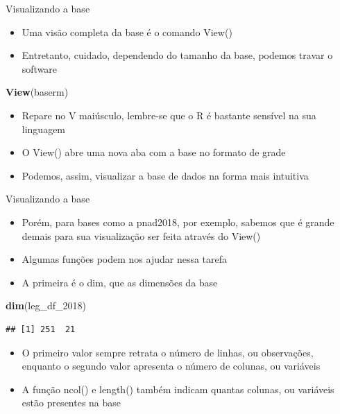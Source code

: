 \documentclass[
  10pt,
  ignorenonframetext,
]{beamer}
\newenvironment{Shaded}{\begin{snugshade}}{\end{snugshade}}
\newcommand{\DecValTok}[1]{\textcolor[rgb]{0.00,0.00,0.81}{#1}}
\newcommand{\KeywordTok}[1]{\textcolor[rgb]{0.13,0.29,0.53}{\textbf{#1}}}
\newcommand{\NormalTok}[1]{#1}
\providecommand{\tightlist}{%
  \setlength{\itemsep}{0pt}\setlength{\parskip}{0pt}}
\begin{document}
\begin{frame}[fragile]{Visualizando a base}
\protect\hypertarget{visualizando-a-base-1}{}
\begin{itemize}
\tightlist
\item
  Uma visão completa da base é o comando View()
\item
  Entretanto, cuidado, dependendo do tamanho da base, podemos travar o
  software
\end{itemize}

\begin{Shaded}
\begin{Highlighting}[]
\KeywordTok{View}\NormalTok{(baserm)}
\end{Highlighting}
\end{Shaded}

\begin{itemize}
\tightlist
\item
  Repare no V maiúsculo, lembre-se que o R é bastante sensível na sua
  linguagem
\item
  O View() abre uma nova aba com a base no formato de grade
\item
  Podemos, assim, visualizar a base de dados na forma mais intuitiva
\end{itemize}
\end{frame}

\begin{frame}[fragile]{Visualizando a base}
\protect\hypertarget{visualizando-a-base-2}{}
\begin{itemize}
\tightlist
\item
  Porém, para bases como a pnad2018, por exemplo, sabemos que é grande
  demais para sua visualização ser feita através do View()
\item
  Algumas funções podem nos ajudar nessa tarefa
\item
  A primeira é o dim, que as dimensões da base
\end{itemize}

\begin{Shaded}
\begin{Highlighting}[]
\KeywordTok{dim}\NormalTok{(leg\_df\_}\DecValTok{2018}\NormalTok{)}
\end{Highlighting}
\end{Shaded}

\begin{verbatim}
## [1] 251  21
\end{verbatim}

\begin{itemize}
\tightlist
\item
  O primeiro valor sempre retrata o número de linhas, ou observações,
  enquanto o segundo valor apresenta o número de colunas, ou variáveis
\item
  A função ncol() e length() também indicam quantas colunas, ou
  variáveis estão presentes na base
\end{itemize}
\end{frame}
\end{document}
